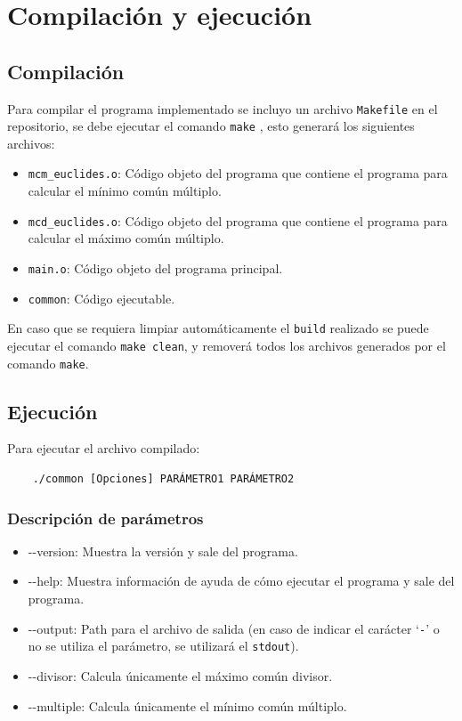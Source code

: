 \documentclass[titlepage,a4paper]{article}
\begin{document}
\section{Compilación y ejecución}

\subsection{Compilación}
Para compilar el programa implementado se incluyo un archivo \verb|Makefile|   en el repositorio, se debe ejecutar el comando \verb|make| \cite{makefile}, esto generará los siguientes archivos: 

\begin{itemize}
    \item \verb|mcm_euclides.o|: Código objeto del programa que contiene el programa para calcular el mínimo común múltiplo.
    \item \verb|mcd_euclides.o|: Código objeto del programa que contiene el programa para calcular el máximo común múltiplo.
    \item \verb|main.o|: Código objeto del programa principal.
    \item \verb|common|: Código ejecutable.
\end{itemize}
En caso que se requiera limpiar automáticamente el \verb|build| realizado se puede ejecutar el comando \verb|make clean|, y removerá todos los archivos generados por el comando \verb|make|.

\subsection{Ejecución}
Para ejecutar el archivo compilado:
\begin{verbatim}
    ./common [Opciones] PARÁMETRO1 PARÁMETRO2
\end{verbatim}

\subsubsection{Descripción de parámetros}
\begin{itemize}
    \cprotect\item[\verb|-V|] {-}{-}version: Muestra la versión y sale del programa.
    \cprotect\item[\verb|-h|] {-}{-}help: Muestra información de ayuda de cómo ejecutar el programa y sale del programa.
    \cprotect\item[\verb|-o|] {-}{-}output: Path para el archivo de salida (en caso de indicar el carácter `\verb|-|' o no se utiliza el parámetro, se utilizará el \verb|stdout|).
    \cprotect\item[\verb|-d|] {-}{-}divisor: Calcula únicamente el máximo común divisor.
    \cprotect\item[\verb|-m|] {-}{-}multiple: Calcula únicamente el mínimo común múltiplo.
\end{itemize}
\end{document}
